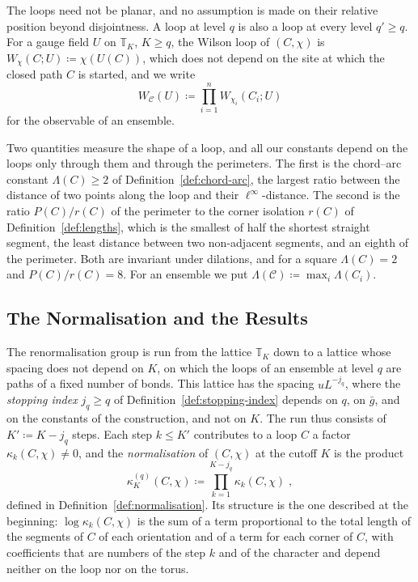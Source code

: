 \documentclass[11pt]{preprint}
\numberwithin{equation}{section}
\theoremstyle{definition}
\theoremstyle{remark}
\theoremstyle{plain}
\begin{document}
The loops need not be planar, and no assumption is made on their relative position beyond disjointness. A loop at level $q$ is also a loop at every level $q' \geq q$. For a gauge field $U$ on $\mathbb T_K$, $K \geq q$, the Wilson loop of $(C, \chi)$ is $W_\chi(C; U) \coloneqq \chi(U(C))$, which does not depend on the site at which the closed path $C$ is started, and we write
\begin{equation}\label{eq:ensemble-observable}
    W_{\mathcal C}(U) \coloneqq \prod_{i=1}^{n}W_{\chi_i}(C_i; U)
\end{equation}
for the observable of an ensemble.

Two quantities measure the shape of a loop, and all our constants depend on the loops only through them and through the perimeters. The first is the chord--arc constant $\Lambda(C) \geq 2$ of Definition~\ref{def:chord-arc}, the largest ratio between the distance of two points along the loop and their $\ell^\infty$-distance. The second is the ratio $P(C)/r(C)$ of the perimeter to the corner isolation $r(C)$ of Definition~\ref{def:lengths}, which is the smallest of half the shortest straight segment, the least distance between two non-adjacent segments, and an eighth of the perimeter. Both are invariant under dilations, and for a square $\Lambda(C) = 2$ and $P(C)/r(C) = 8$. For an ensemble we put $\Lambda(\mathcal C) \coloneqq \max_i\Lambda(C_i)$.

\subsection{The Normalisation and the Results}\label{sec:results}

The renormalisation group is run from the lattice $\mathbb T_K$ down to a lattice whose spacing does not depend on $K$, on which the loops of an ensemble at level $q$ are paths of a fixed number of bonds. This lattice has the spacing $uL^{-j_q}$, where the \emph{stopping index} $j_q \geq q$ of Definition~\ref{def:stopping-index} depends on $q$, on $\bar g$, and on the constants of the construction, and not on $K$. The run thus consists of $K' \coloneqq K - j_q$ steps. Each step $k \leq K'$ contributes to a loop $C$ a factor $\kappa_k(C, \chi) \neq 0$, and the \emph{normalisation} of $(C, \chi)$ at the cutoff $K$ is the product
\begin{equation}\label{eq:normalisation-product}
    \kappa_K^{(q)}(C, \chi) \coloneqq \prod_{k=1}^{K - j_q}\kappa_k(C, \chi)\;,
\end{equation}
defined in Definition~\ref{def:normalisation}. Its structure is the one described at the beginning: $\log\kappa_k(C, \chi)$ is the sum of a term proportional to the total length of the segments of $C$ of each orientation and of a term for each corner of $C$, with coefficients that are numbers of the step $k$ and of the character and depend neither on the loop nor on the torus.
\end{document}
